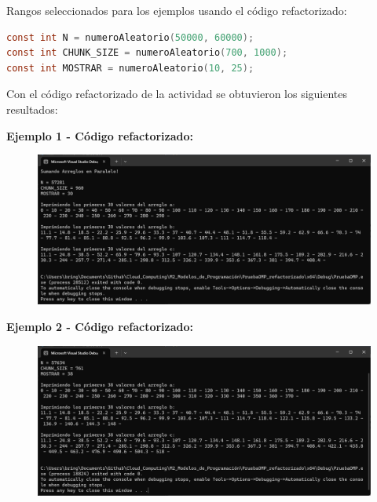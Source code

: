 \documentclass[12pt,a4paper]{article}
\begin{document}
\vspace{1em}

Rangos seleccionados para los ejemplos usando el código refactorizado:

\begin{lstlisting}[language=C, numbers=none]
const int N = numeroAleatorio(50000, 60000);
const int CHUNK_SIZE = numeroAleatorio(700, 1000);
const int MOSTRAR = numeroAleatorio(10, 25);
\end{lstlisting}

\vspace{1em}

Con el código refactorizado de la actividad se obtuvieron los siguientes resultados:

\vspace{1em}

\textbf{Ejemplo 1 - Código refactorizado:}

\begin{figure}[H]
    \centering
    \includegraphics[width=1\linewidth]{M2_Modelos_de_Programación/reporte/figuras/Código_refactorizado_ejemplo-1.png}
    \label{fig:Código_refactorizado_ejemplo-1}
\end{figure}


\textbf{Ejemplo 2 - Código refactorizado:}

\begin{figure}[H]
    \centering
    \includegraphics[width=1\linewidth]{M2_Modelos_de_Programación/reporte/figuras/Código_refactorizado_ejemplo-2.png}
    \label{fig:Código_refactorizado_ejemplo-2}
\end{figure}
\end{document}
